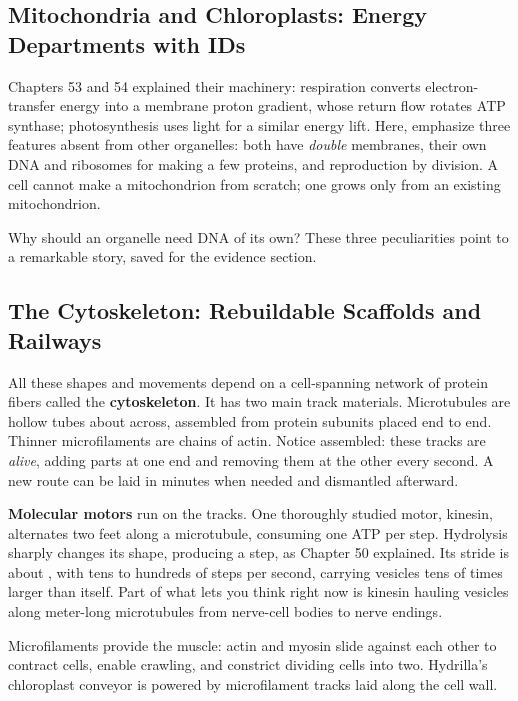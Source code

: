 \subsection{Mitochondria and Chloroplasts: Energy Departments with IDs}

Chapters 53 and 54 explained their machinery: respiration converts electron-transfer energy into a membrane proton gradient, whose return flow rotates ATP synthase; photosynthesis uses light for a similar energy lift. Here, emphasize three features absent from other organelles: both have \emph{double} membranes, their own DNA and ribosomes for making a few proteins, and reproduction by division. A cell cannot make a mitochondrion from scratch; one grows only from an existing mitochondrion.

Why should an organelle need DNA of its own? These three peculiarities point to a remarkable story, saved for the evidence section.

\subsection{The Cytoskeleton: Rebuildable Scaffolds and Railways}

All these shapes and movements depend on a cell-spanning network of protein fibers called the \textbf{cytoskeleton}. It has two main track materials. Microtubules are hollow tubes about  across, assembled from protein subunits placed end to end. Thinner microfilaments are chains of actin. Notice assembled: these tracks are \emph{alive}, adding parts at one end and removing them at the other every second. A new route can be laid in minutes when needed and dismantled afterward.

\textbf{Molecular motors} run on the tracks. One thoroughly studied motor, kinesin, alternates two feet along a microtubule, consuming one ATP per step. Hydrolysis sharply changes its shape, producing a step, as Chapter 50 explained. Its stride is about , with tens to hundreds of steps per second, carrying vesicles tens of times larger than itself. Part of what lets you think right now is kinesin hauling vesicles along meter-long microtubules from nerve-cell bodies to nerve endings.

Microfilaments provide the muscle: actin and myosin slide against each other to contract cells, enable crawling, and constrict dividing cells into two. Hydrilla's chloroplast conveyor is powered by microfilament tracks laid along the cell wall.

